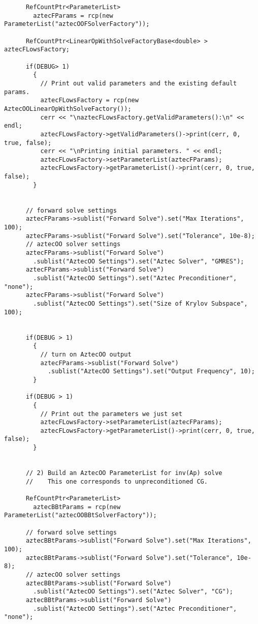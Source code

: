 \begin{verbatim}
      RefCountPtr<ParameterList>
        aztecFParams = rcp(new ParameterList("aztecOOFSolverFactory"));

      RefCountPtr<LinearOpWithSolveFactoryBase<double> > aztecFLowsFactory;

      if(DEBUG> 1)
        {
          // Print out valid parameters and the existing default params.
          aztecFLowsFactory = rcp(new AztecOOLinearOpWithSolveFactory());
          cerr << "\naztecFLowsFactory.getValidParameters():\n" << endl;
          aztecFLowsFactory->getValidParameters()->print(cerr, 0, true, false);
          cerr << "\nPrinting initial parameters. " << endl;
          aztecFLowsFactory->setParameterList(aztecFParams);
          aztecFLowsFactory->getParameterList()->print(cerr, 0, true, false);
        }


      // forward solve settings
      aztecFParams->sublist("Forward Solve").set("Max Iterations", 100);
      aztecFParams->sublist("Forward Solve").set("Tolerance", 10e-8);
      // aztecOO solver settings
      aztecFParams->sublist("Forward Solve")
        .sublist("AztecOO Settings").set("Aztec Solver", "GMRES");
      aztecFParams->sublist("Forward Solve")
        .sublist("AztecOO Settings").set("Aztec Preconditioner", "none");
      aztecFParams->sublist("Forward Solve")
        .sublist("AztecOO Settings").set("Size of Krylov Subspace", 100);


      if(DEBUG > 1)
        {
          // turn on AztecOO output
          aztecFParams->sublist("Forward Solve")
            .sublist("AztecOO Settings").set("Output Frequency", 10);
        }

      if(DEBUG > 1)
        {
          // Print out the parameters we just set
          aztecFLowsFactory->setParameterList(aztecFParams);
          aztecFLowsFactory->getParameterList()->print(cerr, 0, true, false);
        }


      // 2) Build an AztecOO ParameterList for inv(Ap) solve
      //    This one corresponds to unpreconditioned CG.

      RefCountPtr<ParameterList>
        aztecBBtParams = rcp(new ParameterList("aztecOOBBtSolverFactory"));

      // forward solve settings
      aztecBBtParams->sublist("Forward Solve").set("Max Iterations", 100);
      aztecBBtParams->sublist("Forward Solve").set("Tolerance", 10e-8);
      // aztecOO solver settings
      aztecBBtParams->sublist("Forward Solve")
        .sublist("AztecOO Settings").set("Aztec Solver", "CG");
      aztecBBtParams->sublist("Forward Solve")
        .sublist("AztecOO Settings").set("Aztec Preconditioner", "none");



\end{verbatim}
